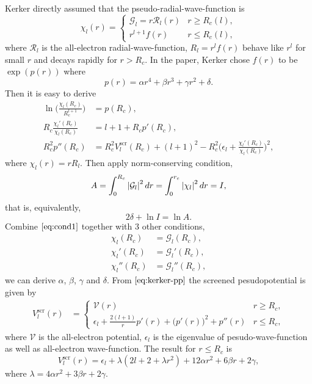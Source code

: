 Kerker directly assumed that the pseudo-radial-wave-function is
\begin{equation}
	\chi_l (r) =
	\begin{cases}
		\mathcal{G}_l = r \mathcal{R}_l (r) & r \geq R_c (l), \\
		r^{l+1} f(r)                        & r \leq R_c (l),
	\end{cases}
\end{equation}
where $\mathcal{R}_l$ is the all-electron radial-wave-function,
$R_l = r^l f(r)$ behave like $r^l$ for small $r$ and decays rapidly for $r > R_c$.
In the paper, Kerker chose $f(r)$ to be $\exp( p(r) )$ where
\begin{equation}
	p(r) =  \alpha r^4 + \beta r^3 + \gamma r^2 + \delta.
\end{equation}
Then it is easy to derive
\begin{align}
	\ln \bigg( \frac{ \chi_l(R_c) }{ R_c^{l+1} } \bigg)
	  & = p(R_c), \label{eq:kerker0}                            \\
	R_c \frac{ \chi_l'(R_c) }{ \chi_l(R_c) }
	  & = l + 1 + R_c p'(R_c), \label{eq:kerker1}               \\
	R_c^2 p''(R_c)
	  & = R_c^2 V_l^\text{scr} (R_c) + (l + 1)^2 - R_c^2 \bigg(
	\epsilon_l + \frac{ \chi_l'(R_c) }{ \chi_l(R_c) }
	\bigg)^2, \label{eq:kerker-pp}
\end{align}
where $\chi_l (r) = r R_l$. Then apply norm-conserving condition,
\begin{equation}
	A = \int_{0}^{R_c} \abs{\mathcal{G}_l}^2 \, dr = \int_{0}^{r_c} \abs{\chi_l}^2 \, dr = I,
\end{equation}
that is, equivalently,
\begin{equation}\label{eq:cond1}
	2\delta + \ln I = \ln A.
\end{equation}
Combine $\eqref{eq:cond1}$ together with $3$ other conditions,
\begin{align}
	\chi_l (R_c)   & = \mathcal{G}_l (R_c),   \\
	\chi_l' (R_c)  & = \mathcal{G}_l' (R_c),  \\
	\chi_l'' (R_c) & = \mathcal{G}_l'' (R_c),
\end{align}
we can derive $\alpha$, $\beta$, $\gamma$ and $\delta$.
From $\eqref{eq:kerker-pp}$ the screened pesudopotential is given by
\begin{align}
	V_l^\text{scr} (r) & =
	\begin{cases}
		\mathcal{V} (r)               & r \geq R_c, \\
		\epsilon_l + \frac{ 2(l+1) }{ r } p'(r)
		+ \big(p'(r) \big)^2 + p''(r) & r \leq R_c,
	\end{cases}
\end{align}
where $\mathcal{V}$ is the all-electron potential, $\epsilon_l$ is the
eigenvalue of pesudo-wave-function as well as all-electron wave-function.
The result for $r \le R_c$ is
\begin{equation}
	V_l^\text{scr} (r) = \epsilon_l + \lambda (2 l + 2 + \lambda r^2) + 12 \alpha r^2 + 6 \beta r + 2 \gamma,
\end{equation}
where $\lambda = 4 \alpha r^2 + 3 \beta r + 2 \gamma$.

